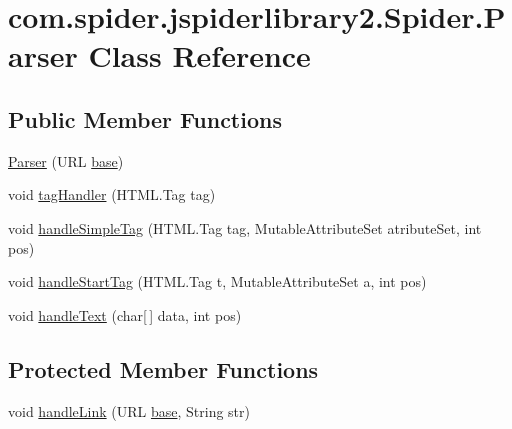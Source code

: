 \hypertarget{classcom_1_1spider_1_1jspiderlibrary2_1_1_spider_1_1_parser}{\section{com.\-spider.\-jspiderlibrary2.\-Spider.\-Parser \-Class \-Reference}
\label{classcom_1_1spider_1_1jspiderlibrary2_1_1_spider_1_1_parser}
}
\subsection*{\-Public \-Member \-Functions}
\begin{DoxyCompactItemize}
\item 
\hyperlink{classcom_1_1spider_1_1jspiderlibrary2_1_1_spider_1_1_parser_a72ae3a543c9a4538a39e552b7118bd6d}{\-Parser} (\-U\-R\-L \hyperlink{classcom_1_1spider_1_1jspiderlibrary2_1_1_spider_1_1_parser_aaac5fcd0aa0bdd67e4c6842d2657231d}{base})
\item 
void \hyperlink{classcom_1_1spider_1_1jspiderlibrary2_1_1_spider_1_1_parser_a04eb14f6a2105866c962a0b1bdc9c568}{tag\-Handler} (\-H\-T\-M\-L.\-Tag tag)
\item 
void \hyperlink{classcom_1_1spider_1_1jspiderlibrary2_1_1_spider_1_1_parser_ae14a442ac7232170e7db1e8f872d6f8a}{handle\-Simple\-Tag} (\-H\-T\-M\-L.\-Tag tag, \-Mutable\-Attribute\-Set atribute\-Set, int pos)
\item 
void \hyperlink{classcom_1_1spider_1_1jspiderlibrary2_1_1_spider_1_1_parser_a1a351dca2ed508a436546687e782d329}{handle\-Start\-Tag} (\-H\-T\-M\-L.\-Tag t, \-Mutable\-Attribute\-Set a, int pos)
\item 
void \hyperlink{classcom_1_1spider_1_1jspiderlibrary2_1_1_spider_1_1_parser_a293631e270d69e91a29de14c980bc9c8}{handle\-Text} (char\mbox{[}$\,$\mbox{]} data, int pos)
\end{DoxyCompactItemize}
\subsection*{\-Protected \-Member \-Functions}
\begin{DoxyCompactItemize}
\item 
void \hyperlink{classcom_1_1spider_1_1jspiderlibrary2_1_1_spider_1_1_parser_aa7bd808ea40da16b1e666113db1b1616}{handle\-Link} (\-U\-R\-L \hyperlink{classcom_1_1spider_1_1jspiderlibrary2_1_1_spider_1_1_parser_aaac5fcd0aa0bdd67e4c6842d2657231d}{base}, \-String str)
\end{DoxyCompactItemize}
